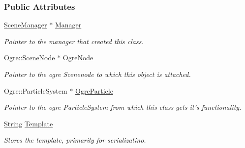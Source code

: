 \subsubsection*{Public Attributes}
\begin{DoxyCompactItemize}
\item 
\hypertarget{structphys_1_1internal_1_1ParticleEffectInternalData_a6e039c2445dcaac7f9a586863affe030}{
\hyperlink{classphys_1_1SceneManager}{SceneManager} $\ast$ \hyperlink{structphys_1_1internal_1_1ParticleEffectInternalData_a6e039c2445dcaac7f9a586863affe030}{Manager}}
\label{structphys_1_1internal_1_1ParticleEffectInternalData_a6e039c2445dcaac7f9a586863affe030}

\begin{DoxyCompactList}\small\item\em Pointer to the manager that created this class. \item\end{DoxyCompactList}\item 
\hypertarget{structphys_1_1internal_1_1ParticleEffectInternalData_a339dac2408197459041f2524badc619e}{
Ogre::SceneNode $\ast$ \hyperlink{structphys_1_1internal_1_1ParticleEffectInternalData_a339dac2408197459041f2524badc619e}{OgreNode}}
\label{structphys_1_1internal_1_1ParticleEffectInternalData_a339dac2408197459041f2524badc619e}

\begin{DoxyCompactList}\small\item\em Pointer to the ogre Scenenode to which this object is attached. \item\end{DoxyCompactList}\item 
\hypertarget{structphys_1_1internal_1_1ParticleEffectInternalData_a2a9776a843e39608d4a4583e4558a2c0}{
Ogre::ParticleSystem $\ast$ \hyperlink{structphys_1_1internal_1_1ParticleEffectInternalData_a2a9776a843e39608d4a4583e4558a2c0}{OgreParticle}}
\label{structphys_1_1internal_1_1ParticleEffectInternalData_a2a9776a843e39608d4a4583e4558a2c0}

\begin{DoxyCompactList}\small\item\em Pointer to the ogre ParticleSystem from which this class gets it's functionality. \item\end{DoxyCompactList}\item 
\hypertarget{structphys_1_1internal_1_1ParticleEffectInternalData_a5c9857e01d36e5957887c1853042bcf2}{
\hyperlink{namespacephys_aa03900411993de7fbfec4789bc1d392e}{String} \hyperlink{structphys_1_1internal_1_1ParticleEffectInternalData_a5c9857e01d36e5957887c1853042bcf2}{Template}}
\label{structphys_1_1internal_1_1ParticleEffectInternalData_a5c9857e01d36e5957887c1853042bcf2}

\begin{DoxyCompactList}\small\item\em Stores the template, primarily for serializatino. \item\end{DoxyCompactList}\end{DoxyCompactItemize}


